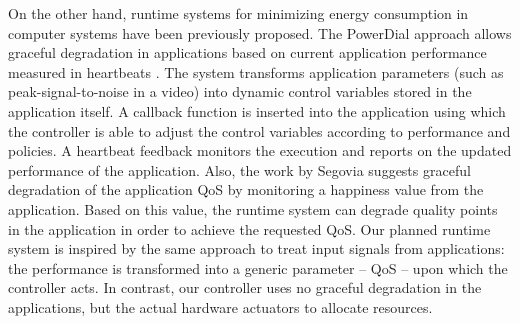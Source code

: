 \documentclass{article}
\begin{document}

On the other hand, runtime systems for minimizing energy consumption in computer systems have been previously proposed.
The PowerDial \cite{Hoffmann:11} approach allows graceful degradation in applications based on current application performance measured in heartbeats \cite{Hoffmann:10}. 
The system transforms application parameters (such as peak-signal-to-noise in a video) into dynamic control variables stored in the application itself. 
A callback function is inserted into the application using which the controller is able to adjust the control variables according to performance and policies.
A heartbeat feedback monitors the execution and reports on the updated performance of the application. 
Also, the work by Segovia \cite{Segovia:11} suggests graceful degradation of the application QoS by monitoring a happiness value from the application. 
Based on this value, the runtime system can degrade quality points in the application in order to achieve the requested QoS. 
Our planned runtime system is inspired by the same approach to treat input signals from applications: the performance is transformed into a generic parameter – QoS – upon which the controller acts.
In contrast, our controller uses no graceful degradation in the applications, but the actual hardware actuators to allocate resources.
\end{document}
